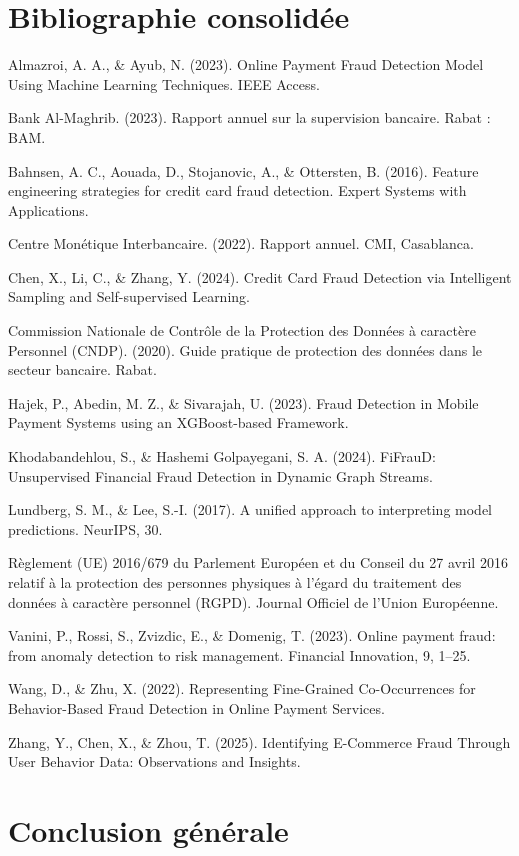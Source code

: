 \section{Bibliographie consolidée}

Almazroi, A. A., \& Ayub, N. (2023). Online Payment Fraud Detection Model Using Machine Learning Techniques. IEEE Access.

Bank Al-Maghrib. (2023). Rapport annuel sur la supervision bancaire. Rabat : BAM.

Bahnsen, A. C., Aouada, D., Stojanovic, A., \& Ottersten, B. (2016). Feature engineering strategies for credit card fraud detection. Expert Systems with Applications.

Centre Monétique Interbancaire. (2022). Rapport annuel. CMI, Casablanca.

Chen, X., Li, C., \& Zhang, Y. (2024). Credit Card Fraud Detection via Intelligent Sampling and Self-supervised Learning.

Commission Nationale de Contrôle de la Protection des Données à caractère Personnel (CNDP). (2020). Guide pratique de protection des données dans le secteur bancaire. Rabat.

Hajek, P., Abedin, M. Z., \& Sivarajah, U. (2023). Fraud Detection in Mobile Payment Systems using an XGBoost-based Framework.

Khodabandehlou, S., \& Hashemi Golpayegani, S. A. (2024). FiFrauD: Unsupervised Financial Fraud Detection in Dynamic Graph Streams.

Lundberg, S. M., \& Lee, S.-I. (2017). A unified approach to interpreting model predictions. NeurIPS, 30.

Règlement (UE) 2016/679 du Parlement Européen et du Conseil du 27 avril 2016 relatif à la protection des personnes physiques à l'égard du traitement des données à caractère personnel (RGPD). Journal Officiel de l'Union Européenne.

Vanini, P., Rossi, S., Zvizdic, E., \& Domenig, T. (2023). Online payment fraud: from anomaly detection to risk management. Financial Innovation, 9, 1–25.

Wang, D., \& Zhu, X. (2022). Representing Fine-Grained Co-Occurrences for Behavior-Based Fraud Detection in Online Payment Services.

Zhang, Y., Chen, X., \& Zhou, T. (2025). Identifying E-Commerce Fraud Through User Behavior Data: Observations and Insights.

\section{Conclusion générale}

